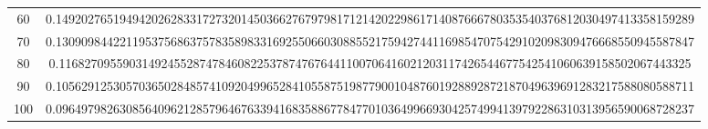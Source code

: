 \documentclass[final]{article}
\begin{document}
\begin{table}
\begin{center}
\begin{tabular}{|c|c|}
60  &   0.1492027651949420262833172732014503662767979817121420229861714087666780353540376812030497413358159289  \\
70  &   0.1309098442211953756863757835898331692550660308855217594274411698547075429102098309476668550945587847  \\
80  &   0.116827095590314924552874784608225378747676441100706416021203117426544677542541060639158502067443325   \\
90  &   0.1056291253057036502848574109204996528410558751987790010487601928892872187049639691283217588080588711  \\
100 &   0.0964979826308564096212857964676339416835886778477010364996693042574994139792286310313956590068728237  \\
\hline
\hline
\end{tabular}
\end{center}
\bigskip\bigskip
\end{table}
\end{document}
